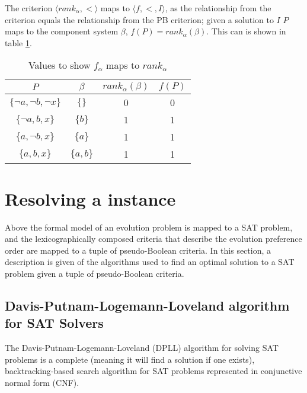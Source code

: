 The criterion $\langle rank_{\alpha},< \rangle$ maps to $\langle f, < , I \rangle$,
as the relationship from the criterion equals the relationship from the PB criterion;
given a solution to $I$ $P$ maps to the component system $\beta$, $f(P) = rank_{\alpha}(\beta)$. 
This can is shown in table \ref{impl.critmapexmp}.
\begin{table}[h!]
\centering
\begin{tabular}{| c | c | c | c |}
\hline
$P$                                &    $\beta$            & $rank_{\alpha}(\beta)$     & $f(P)$\\ \hline    
$\{\neg a, \neg b, \neg x\}$     & $\{\}$                & 0                        & 0 \\
$\{\neg a,  b, x\}$             & $\{b\}$                & 1                        & 1 \\
$\{ a,  \neg b, x\}$             & $\{a\}$                & 1                        & 1 \\
$\{ a,  b, x\}$                 & $\{a,b\}$                & 1                        & 1 \\ \hline
\end{tabular}
\caption{Values to show $f_{\alpha}$  maps to $rank_{\alpha}$}
\label{impl.critmapexmp}
\end{table}


\section{Resolving a \modelname instance}
\label{impl.algorithms}
Above the formal model of an evolution problem is mapped to a SAT problem, 
and the lexicographically composed criteria that describe the evolution preference order are mapped to a tuple of pseudo-Boolean criteria.
In this section, a description is given of the algorithms used to find an optimal solution to a SAT problem given a tuple of pseudo-Boolean criteria. 

\subsection{Davis-Putnam-Logemann-Loveland algorithm for SAT Solvers}
The Davis-Putnam-Logemann-Loveland (DPLL) algorithm \citep{Davis1960, davis1962machine} for solving SAT problems is a complete (meaning it will find a solution if one exists), 
backtracking-based search algorithm for SAT problems represented in conjunctive normal form (CNF).

